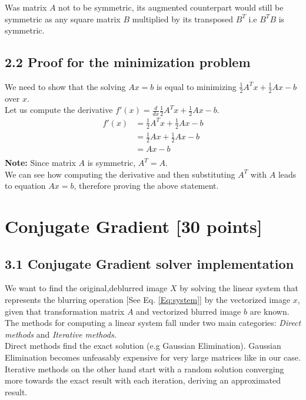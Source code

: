 \documentclass[unicode,11pt,a4paper,oneside,numbers=endperiod,openany]{scrartcl}
\begin{document}
Was matrix $A$ not to be symmetric, its augmented counterpart would still be symmetric as any square matrix $B$ multiplied by its transposed $B^T$ i.e $B^TB$ is symmetric. 



\subsection*{2.2 Proof for the minimization problem}
We need to show that the solving $Ax=b$ is equal to minimizing $\frac{1}{2}A^Tx+\frac{1}{2}Ax-b$ over $x$.\\
Let us compute the derivative $f'(x) = \frac{d}{dx}\frac{1}{2}A^Tx+\frac{1}{2}Ax-b$.\\
\begin{align*}
    f'(x)&= \frac{1}{2}A^Tx+\frac{1}{2}Ax-b\\
    &= \frac{1}{2}Ax+\frac{1}{2}Ax-b\\
    &= Ax-b \\
\end{align*}
\textbf{Note:} Since matrix $A$ is symmetric, $A^T=A$.\\
We can see how computing the derivative and then substituting $A^T$ with $A$ leads to equation $Ax=b$, therefore proving the above statement.




\section{Conjugate Gradient [30 points]}
\subsection*{3.1 Conjugate Gradient solver implementation}
We want to find the original,deblurred image $X$ by solving the linear system that represents the blurring operation [See Eq. \ref{Eq:system}] by the vectorized image $x$, given that transformation matrix $A$ and vectorized blurred image $b$ are known.\\

The methods for computing a linear system fall under two main categories: \textit{Direct methods} and \textit{Iterative methods}.\\
Direct methods find the exact solution (e.g Gaussian Elimination). Gaussian Elimination becomes unfeasably expensive for very large matrices like in our case. Iterative methods on the other hand start with a random solution converging more towards the exact result with each iteration, deriving an approximated result.\\\\
\end{document}
